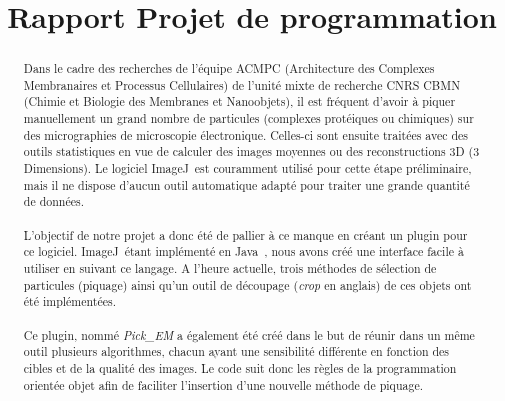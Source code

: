 \documentclass[12pt,a4paper]{report}
\title{Rapport Projet de programmation}
\begin{document}

\newcommand{\cme}{cryo-MET}
\newcommand{\me}{MET}
\newcommand{\java}{Java~{\tiny \texttrademark}}
\newcommand{\js}{JavaScript}
\newcommand{\imj}{ImageJ}

\begin{abstract}
\paragraph*{}
Dans le cadre des recherches de l'équipe ACMPC (Architecture des Complexes Membranaires et Processus Cellulaires) de l'unité mixte de recherche CNRS CBMN (Chimie et Biologie des Membranes et Nanoobjets), il est fréquent d'avoir à piquer manuellement un grand nombre de particules (complexes protéiques ou chimiques) sur des micrographies de microscopie électronique. Celles-ci sont ensuite traitées avec des outils statistiques en vue de calculer des images moyennes ou des reconstructions 3D (3 Dimensions). Le logiciel \imj ~est couramment utilisé pour cette étape préliminaire, mais il ne dispose d'aucun outil automatique adapté pour traiter une grande quantité de données.
\paragraph*{}
L'objectif de notre projet a donc été de pallier à ce manque en créant un plugin pour ce logiciel. \imj ~étant implémenté en \java , nous avons créé une interface facile à utiliser en suivant ce langage. A l'heure actuelle, trois méthodes de sélection de particules (piquage) ainsi qu'un outil de découpage (\textit{crop} en anglais) de ces objets ont été implémentées.
\paragraph*{}
Ce plugin, nommé \emph{Pick\_EM} a également été créé dans le but de réunir dans un même outil plusieurs algorithmes, chacun ayant une sensibilité différente en fonction des cibles et de la qualité des images. Le code suit donc les règles de la programmation orientée objet afin de faciliter l'insertion d'une nouvelle méthode de piquage.

\end{abstract}

\thispagestyle{empty}
\end{document}
